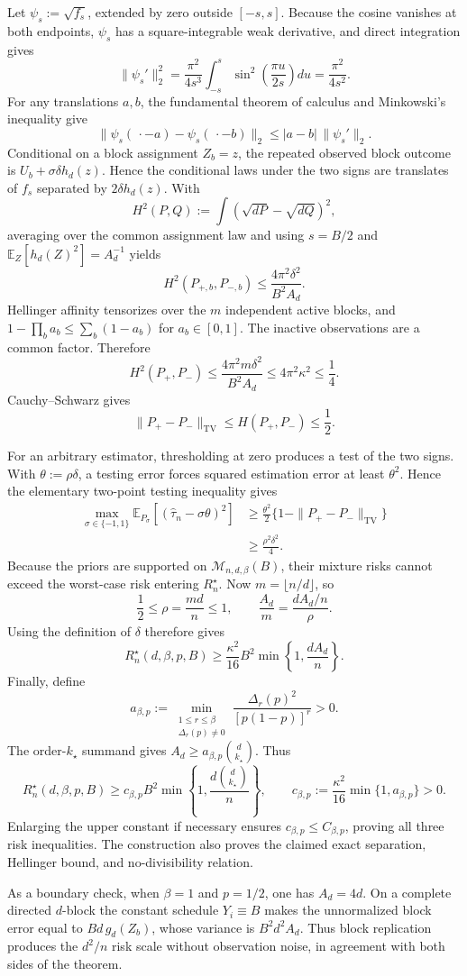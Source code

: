 Let \(\psi_s:=\sqrt{f_s}\), extended by zero outside \([-s,s]\). Because the cosine vanishes at both endpoints, \(\psi_s\) has a square-integrable weak derivative, and direct integration gives
\[
\|\psi_s'\|_2^2
=\frac{\pi^2}{4s^3}\int_{-s}^{s}
\sin^2\!\left(\frac{\pi u}{2s}\right)du
=\frac{\pi^2}{4s^2}.
\]
For any translations \(a,b\), the fundamental theorem of calculus and Minkowski's inequality give
\[
\|\psi_s(\,\cdot-a)-\psi_s(\,\cdot-b)\|_2
\le |a-b|\,\|\psi_s'\|_2.
\]
Conditional on a block assignment \(Z_b=z\), the repeated observed block outcome is \(U_b+\sigma\delta h_d(z)\). Hence the conditional laws under the two signs are translates of \(f_s\) separated by \(2\delta h_d(z)\). With
\[
H^2(P,Q):=\int(\sqrt{dP}-\sqrt{dQ})^2,
\]
averaging over the common assignment law and using \(s=B/2\) and \(\mathbb E_Z[h_d(Z)^2]=A_d^{-1}\) yields
\[
H^2(P_{+,b},P_{-,b})
\le\frac{4\pi^2\delta^2}{B^2A_d}.
\]
Hellinger affinity tensorizes over the \(m\) independent active blocks, and \(1-\prod_b a_b\le\sum_b(1-a_b)\) for \(a_b\in[0,1]\). The inactive observations are a common factor. Therefore
\[
H^2(P_+,P_-)
\le\frac{4\pi^2m\delta^2}{B^2A_d}
\le4\pi^2\kappa^2
\le\frac14.
\]
Cauchy--Schwarz gives
\[
\|P_+-P_-\|_{\mathrm{TV}}
\le H(P_+,P_-)
\le\frac12.
\]

For an arbitrary estimator, thresholding at zero produces a test of the two signs. With \(\theta:=\rho\delta\), a testing error forces squared estimation error at least \(\theta^2\). Hence the elementary two-point testing inequality gives
\[
\begin{aligned}
\max_{\sigma\in\{-1,1\}}
\mathbb E_{P_\sigma}[(\widehat\tau_n-\sigma\theta)^2]
&\ge\frac{\theta^2}{2}
\{1-\|P_+-P_-\|_{\mathrm{TV}}\}\\
&\ge\frac{\rho^2\delta^2}{4}.
\end{aligned}
\]
Because the priors are supported on \(\mathcal M_{n,d,\beta}(B)\), their mixture risks cannot exceed the worst-case risk entering \(R_n^\star\). Now \(m=\lfloor n/d\rfloor\), so
\[
\frac12\le\rho=\frac{md}{n}\le1,
\qquad
\frac{A_d}{m}=\frac{dA_d/n}{\rho}.
\]
Using the definition of \(\delta\) therefore gives
\[
R_n^\star(d,\beta,p,B)
\ge\frac{\kappa^2}{16}B^2
\min\!\left\{1,\frac{dA_d}{n}\right\}.
\]
Finally, define
\[
a_{\beta,p}:=
\min_{\substack{1\le r\le\beta\\\Delta_r(p)\ne0}}
\frac{\Delta_r(p)^2}{[p(1-p)]^r}>0.
\]
The order-\(k_\star\) summand gives \(A_d\ge a_{\beta,p}\binom d{k_\star}\). Thus
\[
R_n^\star(d,\beta,p,B)
\ge c_{\beta,p}B^2
\min\!\left\{1,\frac{d\binom d{k_\star}}{n}\right\},
\qquad
c_{\beta,p}:=\frac{\kappa^2}{16}\min\{1,a_{\beta,p}\}>0.
\]
Enlarging the upper constant if necessary ensures \(c_{\beta,p}\le C_{\beta,p}\), proving all three risk inequalities. The construction also proves the claimed exact separation, Hellinger bound, and no-divisibility relation.

As a boundary check, when \(\beta=1\) and \(p=1/2\), one has \(A_d=4d\). On a complete directed \(d\)-block the constant schedule \(Y_i\equiv B\) makes the unnormalized block error equal to \(Bd\,g_d(Z_b)\), whose variance is \(B^2d^2A_d\). Thus block replication produces the \(d^2/n\) risk scale without observation noise, in agreement with both sides of the theorem.
